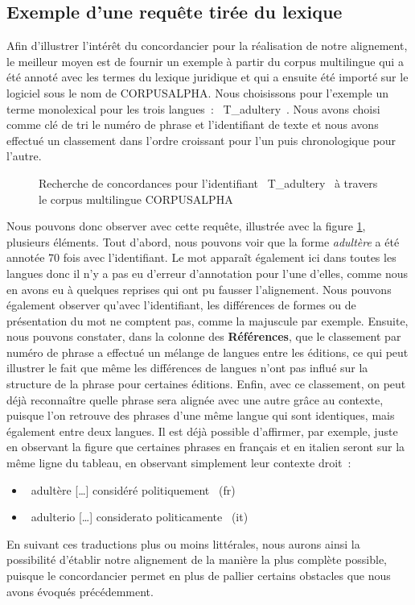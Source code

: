 \subsection{Exemple d’une requête tirée du lexique}
Afin d’illustrer l’intérêt du concordancier pour la réalisation de notre alignement, le meilleur moyen est de fournir un exemple à partir du corpus multilingue qui a été annoté avec les termes du lexique juridique et qui a ensuite été importé sur le logiciel sous le nom de CORPUSALPHA. Nous choisissons pour l’exemple un terme monolexical pour les trois langues~: \og~T\_adultery~\fg{}. Nous avons choisi comme clé de tri le numéro de phrase et l’identifiant de texte et nous avons effectué un classement dans l’ordre croissant pour l’un puis chronologique pour l’autre. 
\begin{figure}[p]
    \centering
    \caption{Recherche de concordances pour l’identifiant \og~T\_adultery~\fg{} à travers le corpus multilingue CORPUSALPHA}
    \label{fig:concordancier_adultery}
\end{figure}
Nous pouvons donc observer avec cette requête, illustrée avec la figure \ref{fig:concordancier_adultery}, plusieurs éléments. Tout d’abord, nous pouvons voir que la forme \textit{adultère} a été annotée 70 fois avec l’identifiant. Le mot apparaît également ici dans toutes les langues donc il n’y a pas eu d’erreur d’annotation pour l'une d'elles, comme nous en avons eu à quelques reprises qui ont pu fausser l’alignement. Nous pouvons également observer qu’avec l’identifiant, les différences de formes ou de présentation du mot ne comptent pas, comme la majuscule par exemple. Ensuite, nous pouvons constater, dans la colonne des \textbf{Références}, que le classement par numéro de phrase a effectué un mélange de langues entre les éditions, ce qui peut illustrer le fait que même les différences de langues n’ont pas influé sur la structure de la phrase pour certaines éditions. Enfin, avec ce classement, on peut déjà reconnaître quelle phrase sera alignée avec une autre grâce au contexte, puisque l’on retrouve des phrases d’une même langue qui sont identiques, mais également entre deux langues. Il est déjà possible d’affirmer, par exemple, juste en observant la figure que certaines phrases en français et en italien seront sur la même ligne du tableau, en observant simplement leur contexte droit~:
\begin{itemize}
    \item \og~adultère [\dots] considéré politiquement~\fg{} (fr)
    \item \og~adulterio [\dots] considerato politicamente~\fg{} (it)
\end{itemize}
En suivant ces traductions plus ou moins littérales, nous aurons ainsi la possibilité d’établir notre alignement de la manière la plus complète possible, puisque le concordancier permet en plus de pallier certains obstacles que nous avons évoqués précédemment.

